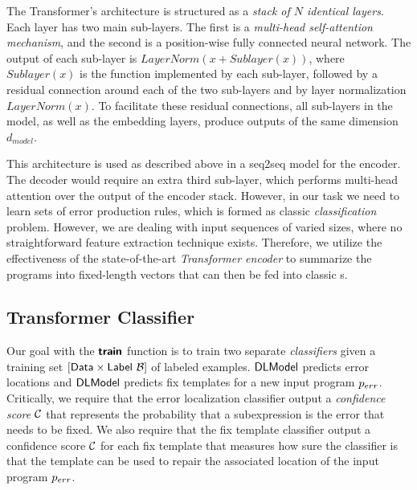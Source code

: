 The Transformer's architecture is structured as a \emph{stack of $N$ identical
layers}. Each layer has two main sub-layers. The first is a \emph{multi-head
self-attention mechanism}, and the second is a position-wise fully connected
neural network. The output of each sub-layer is $LayerNorm(x + Sublayer(x))$,
where $Sublayer(x)$ is the function implemented by each sub-layer, followed by a
residual connection around each of the two sub-layers and  by layer
normalization $LayerNorm(x)$. To facilitate these residual connections, all
sub-layers in the model, as well as the embedding layers, produce outputs of the
same dimension $d_{model}$.

This architecture is used as described above in a seq2seq model
\citep{Vaswani_2017} for the encoder. The decoder would require an extra third
sub-layer, which performs multi-head attention over the output of the encoder
stack. However, in our task we need to learn sets of error production rules,
which is formed as classic \emph{classification} problem. However, we are
dealing with input sequences of varied sizes, where no straightforward feature
extraction technique exists. Therefore, we utilize the effectiveness of the
state-of-the-art \emph{Transformer encoder} to summarize the programs into
fixed-length vectors that can then be fed into classic \dnn{}s.


\subsection{Transformer Classifier}
\label{sec:seq-classifiers:location-rank}

Our goal with the $\bm{\mathsf{train}}$ function is to train two separate
\emph{classifiers} given a training set $[\mathsf{Data} \times
\mathsf{Label}\ \mathcal{B}]$ of labeled examples. $\mathsf{DLModel}$ predicts error locations and
$\mathsf{DLModel}$ predicts fix templates for a new input program $p_{err}$. Critically, we
require that the error localization classifier output a \emph{confidence score}
$\mathcal{C}$ that represents the probability that a subexpression is the error that
needs to be fixed. We also require that the fix template classifier output a
confidence score $\mathcal{C}$ for each fix template that measures
how sure the classifier is that the template can be used to repair the
associated location of the input program $p_{err}$.

